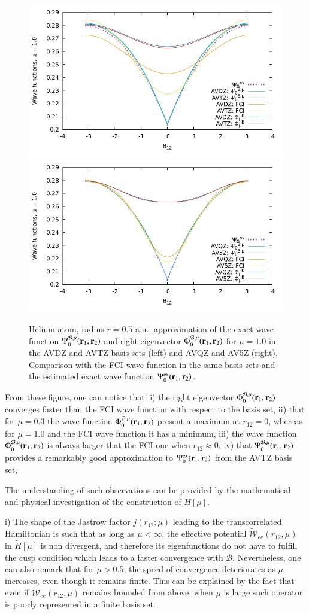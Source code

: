 \documentclass[aip,jcp,reprint,noshowkeys,superscriptaddress]{revtex4-1}
\newcommand{\br}[0]{{\bf {r}}}
\newcommand{\psiex}[0]{\Psi^{\text{ex}}_0}
\newcommand{\phimub}[0]{\Phi^{\mathcal{B},\mu}_0}
\newcommand{\psimub}[0]{\Psi^{\mathcal{B},\mu}_0}
\newcommand{\basis}[0]{\mathcal{B}}
\begin{document}
\begin{figure}
 \label{fig:mu_1.0_dz_3}
        \includegraphics[width=0.45\linewidth]{plots/He/He_mu_1_0_cusp_avdz_avtz_3.pdf}
        \includegraphics[width=0.45\linewidth]{plots/He/He_mu_1_0_cusp_avqz_av5z_3.pdf}\\
        \caption{
        Helium atom, radius $r=0.5$ a.u.: approximation of the exact wave function $\psimub(\br{}_1,\br{}_2)$ and right eigenvector $\phimub(\br{}_1,\br{}_2)$ for $\mu=1.0$ in the AVDZ and AVTZ basis sets (left) and AVQZ and AV5Z (right). Comparison with the FCI wave function in the same basis sets and the estimated exact wave function $\psiex(\br{}_1,\br{}_2)$.  }
\end{figure}


From these figure, one can notice that: 
i) the right eigenvector $\phimub(\br{}_1,\br{}_2)$ converges faster than the FCI wave function with respect to the basis set, 
ii) that for $\mu=0.3$ the wave function $\phimub(\br{}_1,\br{}_2)$ present a maximum at $r_{12}=0$, whereas for $\mu=1.0$ and the FCI wave function it has a minimum, 
iii) the wave function $\phimub(\br{}_1,\br{}_2)$ is always larger that the FCI one when $r_{12}\approx 0$. 
iv) that $\psimub(\br{}_1,\br{}_2)$ provides a remarkably good approximation to $\psiex(\br{}_1,\br{}_2)$ from the AVTZ basis set, 

The understanding of such observations can be provided by the mathematical and physical investigation of the construction of $\tilde{H}[\mu]$. 

i) The shape of the Jastrow factor $j(r_{12};\mu)$ leading to the transcorrelated Hamiltonian is such that as long as $\mu < \infty$, the effective potential $\tilde{\mathcal{W}}_{ee}(r_{12},\mu)$ in $\tilde{H}[\mu]$ is non divergent, and therefore its eigenfunctions do not have to fulfill the cusp condition which leads to a faster convergence with $\basis$. 
Nevertheless, one can also remark that for $\mu > 0.5$, the speed of convergence deteriorates as $\mu$ increases, even though it remains finite. This can be explained by the fact that even if $\tilde{\mathcal{W}}_{ee}(r_{12},\mu)$ remains bounded from above, when $\mu$ is large such operator is poorly represented in a finite basis set. 
\end{document}
